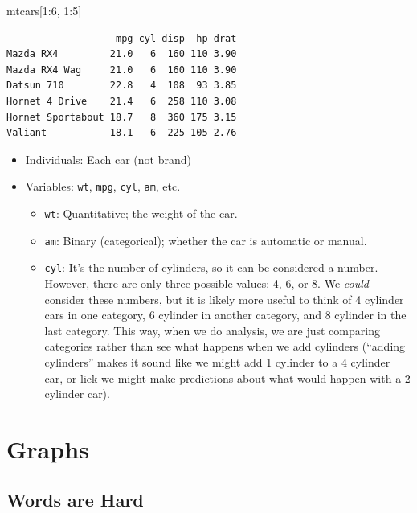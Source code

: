 \documentclass[
  letterpaper,
  DIV=11,
  numbers=noendperiod]{scrreprt}
\newenvironment{Shaded}{\begin{snugshade}}{\end{snugshade}}
\newcommand{\DecValTok}[1]{\textcolor[rgb]{0.68,0.00,0.00}{#1}}
\newcommand{\NormalTok}[1]{\textcolor[rgb]{0.00,0.23,0.31}{#1}}
\newcommand{\SpecialCharTok}[1]{\textcolor[rgb]{0.37,0.37,0.37}{#1}}
\providecommand{\tightlist}{%
  \setlength{\itemsep}{0pt}\setlength{\parskip}{0pt}}\usepackage{longtable,booktabs,array}
\begin{document}
\begin{Shaded}
\begin{Highlighting}[]
\NormalTok{mtcars[}\DecValTok{1}\SpecialCharTok{:}\DecValTok{6}\NormalTok{, }\DecValTok{1}\SpecialCharTok{:}\DecValTok{5}\NormalTok{]}
\end{Highlighting}
\end{Shaded}

\begin{verbatim}
                   mpg cyl disp  hp drat
Mazda RX4         21.0   6  160 110 3.90
Mazda RX4 Wag     21.0   6  160 110 3.90
Datsun 710        22.8   4  108  93 3.85
Hornet 4 Drive    21.4   6  258 110 3.08
Hornet Sportabout 18.7   8  360 175 3.15
Valiant           18.1   6  225 105 2.76
\end{verbatim}

\begin{itemize}
\tightlist
\item
  Individuals: Each car (not brand)
\item
  Variables: \texttt{wt}, \texttt{mpg}, \texttt{cyl}, \texttt{am}, etc.

  \begin{itemize}
  \tightlist
  \item
    \texttt{wt}: Quantitative; the weight of the car.
  \item
    \texttt{am}: Binary (categorical); whether the car is automatic or
    manual.
  \item
    \texttt{cyl}: It's the number of cylinders, so it can be considered
    a number. However, there are only three possible values: 4, 6, or 8.
    We \emph{could} consider these numbers, but it is likely more useful
    to think of 4 cylinder cars in one category, 6 cylinder in another
    category, and 8 cylinder in the last category. This way, when we do
    analysis, we are just comparing categories rather than see what
    happens when we add cylinders (``adding cylinders'' makes it sound
    like we might add 1 cylinder to a 4 cylinder car, or liek we might
    make predictions about what would happen with a 2 cylinder car).
  \end{itemize}
\end{itemize}

\hypertarget{graphs}{%
\chapter{Graphs}\label{graphs}}

\hypertarget{words-are-hard}{%
\section{Words are Hard}\label{words-are-hard}}
\end{document}
